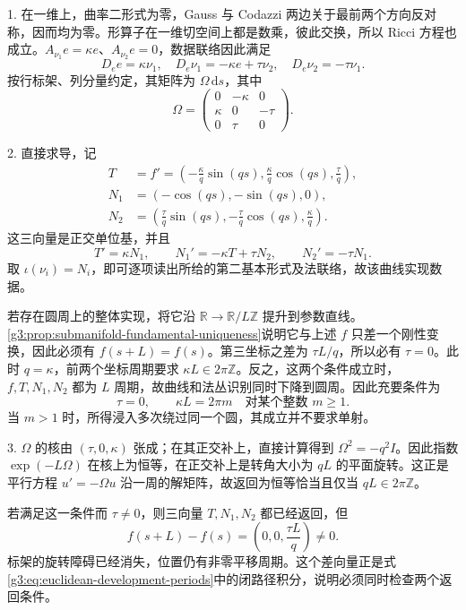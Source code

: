 \begin{solution}
	1. 在一维上，曲率二形式为零，Gauss 与 Codazzi 两边关于最前两个方向反对称，因而均为零。形算子在一维切空间上都是数乘，彼此交换，所以 Ricci 方程也成立。\(A_{\nu_1}e=\kappa e\)、\(A_{\nu_2}e=0\)，数据联络因此满足
	\[
		D_ee=\kappa\nu_1,\quad
		D_e\nu_1=-\kappa e+\tau\nu_2,\quad
		D_e\nu_2=-\tau\nu_1.
	\]
	按行标架、列分量约定，其矩阵为 \(\Omega\,\mathrm ds\)，其中
	\[
		\Omega=\begin{pmatrix}
			0&-\kappa&0\\
			\kappa&0&-\tau\\
			0&\tau&0
		\end{pmatrix}.
	\]

	2. 直接求导，记
	\[
		\begin{aligned}
		T&=f'=\left(-\frac\kappa q\sin(qs),\frac\kappa q\cos(qs),\frac\tau q\right),\\
		N_1&=(-\cos(qs),-\sin(qs),0),\\
		N_2&=\left(\frac\tau q\sin(qs),-\frac\tau q\cos(qs),\frac\kappa q\right).
		\end{aligned}
	\]
	这三向量是正交单位基，并且
	\[
		T'=\kappa N_1,\qquad
		N_1'=-\kappa T+\tau N_2,\qquad
		N_2'=-\tau N_1.
	\]
	取 \(\iota(\nu_i)=N_i\)，即可逐项读出所给的第二基本形式及法联络，故该曲线实现数据。

	若存在圆周上的整体实现，将它沿 \(\mathbb R\to\mathbb R/L\mathbb Z\) 提升到参数直线。\cref{g3:prop:submanifold-fundamental-uniqueness}说明它与上述 \(f\) 只差一个刚性变换，因此必须有 \(f(s+L)=f(s)\)。第三坐标之差为 \(\tau L/q\)，所以必有 \(\tau=0\)。此时 \(q=\kappa\)，前两个坐标周期要求 \(\kappa L\in2\pi\mathbb Z\)。反之，这两个条件成立时，\(f,T,N_1,N_2\) 都为 \(L\) 周期，故曲线和法丛识别同时下降到圆周。因此充要条件为
	\[
		\tau=0,\qquad \kappa L=2\pi m\quad\text{对某个整数 }m\geq1.
	\]
	当 \(m>1\) 时，所得浸入多次绕过同一个圆，其成立并不要求单射。

	3. \(\Omega\) 的核由 \((\tau,0,\kappa)\) 张成；在其正交补上，直接计算得到 \(\Omega^2=-q^2I\)。因此指数 \(\exp(-L\Omega)\) 在核上为恒等，在正交补上是转角大小为 \(qL\) 的平面旋转。这正是平行方程 \(u'=-\Omega u\) 沿一周的解矩阵，故返回为恒等恰当且仅当 \(qL\in2\pi\mathbb Z\)。

	若满足这一条件而 \(\tau\ne0\)，则三向量 \(T,N_1,N_2\) 都已经返回，但
	\[
		f(s+L)-f(s)=\left(0,0,\frac{\tau L}{q}\right)\ne0.
	\]
	标架的旋转障碍已经消失，位置仍有非零平移周期。这个差向量正是式\eqref{g3:eq:euclidean-development-periods}中的闭路径积分，说明必须同时检查两个返回条件。
\end{solution}

